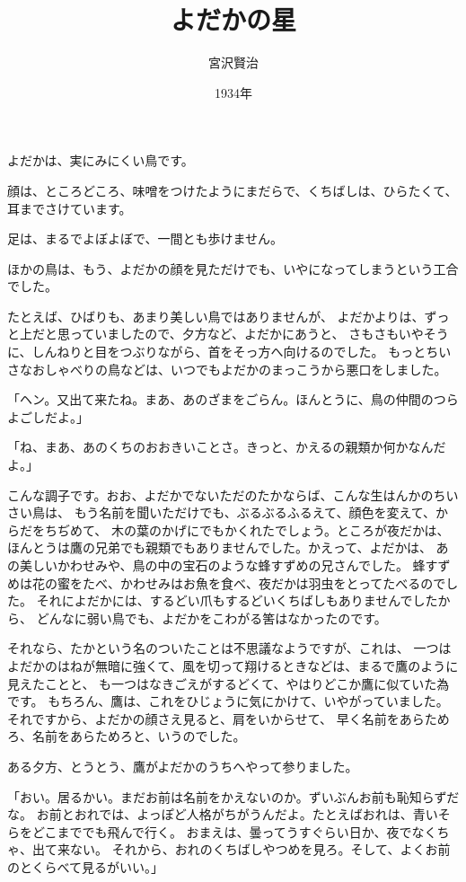 \documentclass[a4paper, platex, dvipdfmx]{jsarticle}
\title{よだかの星}
\author{宮沢賢治}
\date{1934年}
\begin{document}
\maketitle
よだかは、実にみにくい鳥です。

顔は、ところどころ、味噌をつけたようにまだらで、くちばしは、ひらたくて、耳までさけています。

足は、まるでよぼよぼで、一間とも歩けません。

ほかの鳥は、もう、よだかの顔を見ただけでも、いやになってしまうという工合でした。

たとえば、ひばりも、あまり美しい鳥ではありませんが、
よだかよりは、ずっと上だと思っていましたので、夕方など、よだかにあうと、
さもさもいやそうに、しんねりと目をつぶりながら、首をそっ方へ向けるのでした。
もっとちいさなおしゃべりの鳥などは、いつでもよだかのまっこうから悪口をしました。

「ヘン。又出て来たね。まあ、あのざまをごらん。ほんとうに、鳥の仲間のつらよごしだよ。」

「ね、まあ、あのくちのおおきいことさ。きっと、かえるの親類か何かなんだよ。」

こんな調子です。おお、よだかでないただのたかならば、こんな生はんかのちいさい鳥は、
もう名前を聞いただけでも、ぶるぶるふるえて、顔色を変えて、からだをちぢめて、
木の葉のかげにでもかくれたでしょう。ところが夜だかは、
ほんとうは鷹の兄弟でも親類でもありませんでした。かえって、よだかは、
あの美しいかわせみや、鳥の中の宝石のような蜂すずめの兄さんでした。
蜂すずめは花の蜜をたべ、かわせみはお魚を食べ、夜だかは羽虫をとってたべるのでした。
それによだかには、するどい爪もするどいくちばしもありませんでしたから、
どんなに弱い鳥でも、よだかをこわがる筈はなかったのです。

それなら、たかという名のついたことは不思議なようですが、これは、
一つはよだかのはねが無暗に強くて、風を切って翔けるときなどは、まるで鷹のように見えたことと、
も一つはなきごえがするどくて、やはりどこか鷹に似ていた為です。
もちろん、鷹は、これをひじょうに気にかけて、いやがっていました。
それですから、よだかの顔さえ見ると、肩をいからせて、
早く名前をあらためろ、名前をあらためろと、いうのでした。

ある夕方、とうとう、鷹がよだかのうちへやって参りました。

「おい。居るかい。まだお前は名前をかえないのか。ずいぶんお前も恥知らずだな。
お前とおれでは、よっぽど人格がちがうんだよ。たとえばおれは、青いそらをどこまででも飛んで行く。
おまえは、曇ってうすぐらい日か、夜でなくちゃ、出て来ない。
それから、おれのくちばしやつめを見ろ。そして、よくお前のとくらべて見るがいい。」
\end{document}
